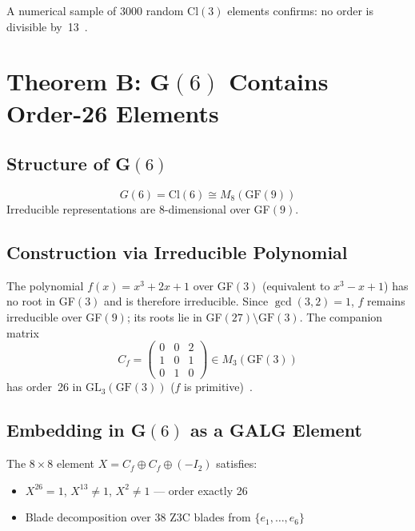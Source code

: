 A numerical sample of 3000 random Cl$(3)$ elements confirms:
no order is divisible by~13~\BM.

\section{Theorem B: G$(6)$ Contains Order-26 Elements}

\subsection{Structure of G$(6)$}

\begin{equation}
  G(6) = \text{Cl}(6) \cong M_8(\text{GF}(9))
\end{equation}
Irreducible representations are 8-dimensional over GF$(9)$.

\subsection{Construction via Irreducible Polynomial}

The polynomial $f(x) = x^3 + 2x + 1$ over GF$(3)$ (equivalent to $x^3 - x + 1$)
has no root in GF$(3)$ and is therefore irreducible.
Since $\gcd(3,2) = 1$, $f$ remains irreducible over GF$(9)$;
its roots lie in GF$(27) \setminus \text{GF}(3)$.
The companion matrix
\begin{equation}
  C_f = \begin{pmatrix} 0 & 0 & 2 \\ 1 & 0 & 1 \\ 0 & 1 & 0 \end{pmatrix}
  \in M_3(\text{GF}(3))
\end{equation}
has order~26 in $\text{GL}_3(\text{GF}(3))$ ($f$ is primitive)~\BM.

\subsection{Embedding in G$(6)$ as a GALG Element}

The $8 \times 8$ element $X = C_f \oplus C_f \oplus (-I_2)$ satisfies:
\begin{itemize}
  \item $X^{26} = 1$, $X^{13} \neq 1$, $X^{2} \neq 1$ --- order exactly 26~\BM
  \item Blade decomposition over 38 Z3C blades from $\{e_1,\ldots,e_6\}$
\end{itemize}

